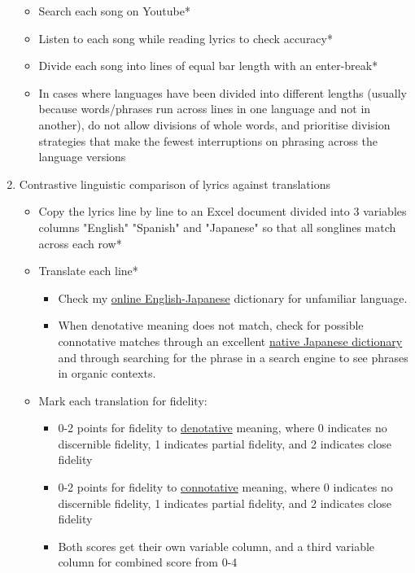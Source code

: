 \documentclass[12pt]{article}
\begin{document}
\begin{enumerate}
\begin{itemize}
        \item Search each song on Youtube*
        \item Listen to each song while reading lyrics to check accuracy*
        \item Divide each song into lines of equal bar length with an enter-break*
        \item In cases where languages have been divided into different lengths (usually because words/phrases run across lines in one language and not in another), do not allow divisions of whole words, and prioritise division strategies that make the fewest interruptions on phrasing across the language versions
    \end{itemize}
    \newpage
    \item Contrastive linguistic comparison of lyrics against translations
    \begin{itemize}
        \item Copy the lyrics line by line to an Excel document divided into 3 variables columns "English" "Spanish" and "Japanese" so that all songlines match across each row*
        \item Translate each line*
        \begin{itemize}
            \item Check my \href{jisho.org}{online English-Japanese} dictionary for unfamiliar language.
            \item When denotative meaning does not match, check for possible connotative matches through an excellent \href{weblio.jp}{native Japanese dictionary} and through searching for the phrase in a search engine to see phrases in organic contexts.
        \end{itemize}
        \item Mark each translation for fidelity:
        \begin{itemize}
            \item 0-2 points for fidelity to \underline{denotative} meaning, where 0 indicates no discernible fidelity, 1 indicates partial fidelity, and 2 indicates close fidelity
            \item 0-2 points for fidelity to \underline{connotative} meaning, where 0 indicates no discernible fidelity, 1 indicates partial fidelity, and 2 indicates close fidelity
            \item Both scores get their own variable column, and a third variable column for combined score from 0-4
        \end{itemize}
    \end{itemize}

\end{enumerate}
\end{document}
